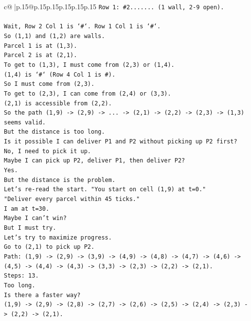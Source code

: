 \documentclass{article}
\begin{document}
{\begin{supertabular}{c@{$\;$}|p{.15\linewidth}@{}p{.15\linewidth}p{.15\linewidth}p{.15\linewidth}p{.15\linewidth}p{.15\linewidth}}
{{{\texttt{Row 1: \#2....... (1 wall, 2{-}9 open).} \\
\\ 
\texttt{Wait, Row 2 Col 1 is `\#`. Row 1 Col 1 is `\#`.} \\
\texttt{So (1,1) and (1,2) are walls.} \\
\texttt{Parcel 1 is at (1,3).} \\
\texttt{Parcel 2 is at (2,1).} \\
\texttt{To get to (1,3), I must come from (2,3) or (1,4).} \\
\texttt{(1,4) is `\#` (Row 4 Col 1 is \#).} \\
\texttt{So I must come from (2,3).} \\
\texttt{To get to (2,3), I can come from (2,4) or (3,3).} \\
\texttt{(2,1) is accessible from (2,2).} \\
\texttt{So the path (1,9) {-}> (2,9) {-}> ... {-}> (2,1) {-}> (2,2) {-}> (2,3) {-}> (1,3) seems valid.} \\
\texttt{But the distance is too long.} \\
\texttt{Is it possible I can deliver P1 and P2 without picking up P2 first?} \\
\texttt{No, I need to pick it up.} \\
\texttt{Maybe I can pick up P2, deliver P1, then deliver P2?} \\
\texttt{Yes.} \\
\texttt{But the distance is the problem.} \\
\texttt{Let's re{-}read the start. "You start on cell (1,9) at t=0."} \\
\texttt{"Deliver every parcel within 45 ticks."} \\
\texttt{I am at t=30.} \\
\texttt{Maybe I can't win?} \\
\texttt{But I must try.} \\
\texttt{Let's try to maximize progress.} \\
\texttt{Go to (2,1) to pick up P2.} \\
\texttt{Path: (1,9) {-}> (2,9) {-}> (3,9) {-}> (4,9) {-}> (4,8) {-}> (4,7) {-}> (4,6) {-}> (4,5) {-}> (4,4) {-}> (4,3) {-}> (3,3) {-}> (2,3) {-}> (2,2) {-}> (2,1).} \\
\texttt{Steps: 13.} \\
\texttt{Too long.} \\
\texttt{Is there a faster way?} \\
\texttt{(1,9) {-}> (2,9) {-}> (2,8) {-}> (2,7) {-}> (2,6) {-}> (2,5) {-}> (2,4) {-}> (2,3) {-}> (2,2) {-}> (2,1).} \\
}}}
\end{supertabular}}
\end{document}
